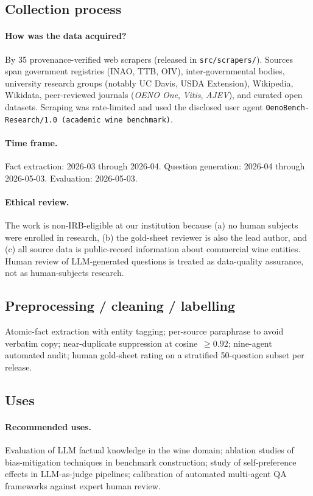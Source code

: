 \subsection{Collection process}
\paragraph{How was the data acquired?}
By 35 provenance-verified web scrapers (released in
\texttt{src/scrapers/}). Sources span government registries (INAO,
TTB, OIV), inter-governmental bodies, university research groups
(notably UC Davis, USDA Extension), Wikipedia, Wikidata, peer-reviewed
journals (\emph{OENO One}, \emph{Vitis}, \emph{AJEV}), and curated
open datasets. Scraping was rate-limited and used the disclosed user
agent \texttt{OenoBench-Research/1.0 (academic wine benchmark)}.

\paragraph{Time frame.}
Fact extraction: 2026-03 through 2026-04. Question generation:
2026-04 through 2026-05-03. Evaluation: 2026-05-03.

\paragraph{Ethical review.}
The work is non-IRB-eligible at our institution because (a) no human
subjects were enrolled in research, (b) the gold-sheet reviewer is
also the lead author, and (c) all source data is public-record
information about commercial wine entities. Human review of
LLM-generated questions is treated as data-quality assurance, not as
human-subjects research.

\subsection{Preprocessing / cleaning / labelling}
Atomic-fact extraction with entity tagging; per-source paraphrase to
avoid verbatim copy; near-duplicate suppression at cosine~$\geq 0.92$;
nine-agent automated audit; human gold-sheet rating on a stratified
50-question subset per release.

\subsection{Uses}
\paragraph{Recommended uses.} Evaluation of LLM factual knowledge in
the wine domain; ablation studies of bias-mitigation techniques in
benchmark construction; study of self-preference effects in
LLM-as-judge pipelines; calibration of automated multi-agent QA
frameworks against expert human review.

